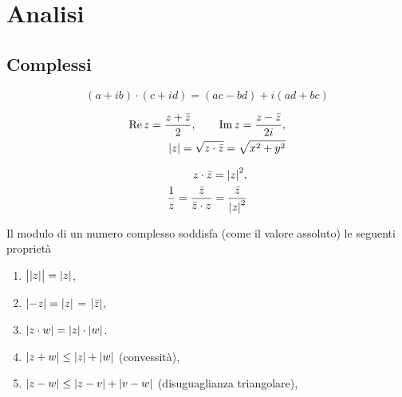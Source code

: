 \chapter{Analisi}

\section{Complessi}

\begin{equation}\label{sin}
    (a+ib) \cdot (c+id) = (ac-bd) + i(ad+bc)
\end{equation}

\begin{equation}\label{sin}
\begin{aligned}
    \operatorname{Re} z = \frac{z+\bar z}{2}, \qquad
	\operatorname{Im} z = \frac{z-\bar z}{2i},\\
	{\left|z\right|} = \sqrt{z\cdot\bar z} = \sqrt{x^2+y^2}
\end{aligned}
\end{equation}

\begin{equation}
\begin{aligned}
    z\cdot \bar z = {\left|z\right|}^2,\\
	\frac{1}{z} = \frac{\bar z}{ \bar z \cdot z} = \frac{\bar z}{{\left|z\right|}^2}
\end{aligned}
\end{equation}

\begin{theorem}
Il modulo di un numero complesso soddisfa (come il valore assoluto)
le seguenti proprietà
\begin{enumerate}
\item $\big\lvert{\left|z\right|}\big\rvert = {\left|z\right|}$,
\item ${\left|-z\right|} = {\left|z\right|}$ = ${\left|\bar z\right|}$,
\item ${\left|z\cdot w\right|} = {\left|z\right|}\cdot{\left|w\right|}$.
\item ${\left|z+w\right|} \le {\left|z\right|}+{\left|w\right|}$ (convessità),
\item ${\left|z-w\right|} \le {\left|z-v\right|} + {\left|v-w\right|}$ (disuguaglianza triangolare),
\end{enumerate}
\end{theorem}

